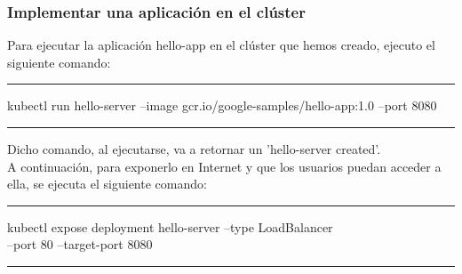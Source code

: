 \documentclass[english,runningheads,a4paper]{llncs}[2018/03/10]
\newenvironment{nscenter}
 {\parskip=0pt\par\nopagebreak\centering}
 {\par\noindent\ignorespacesafterend}
\begin{document}
\subsubsection*{Implementar una aplicación en el clúster}
Para ejecutar la aplicación hello-app en el clúster que hemos creado, ejecuto 
el siguiente comando:
\begin{nscenter}


\noindent\rule{10cm}{0.4pt}

kubectl run hello-server --image gcr.io/google-samples/hello-app:1.0 --port 8080

\noindent\rule{10cm}{0.4pt}
\end{nscenter}
Dicho comando, al ejecutarse, va a retornar un 'hello-server created'. \\
A continuación, para exponerlo en Internet y que los usuarios puedan acceder a 
ella, se ejecuta el siguiente comando:
\begin{nscenter}


\noindent\rule{10cm}{0.4pt}

kubectl expose deployment hello-server --type LoadBalancer \ \\
  --port 80 --target-port 8080

\noindent\rule{10cm}{0.4pt}
\end{nscenter}
\end{document}

